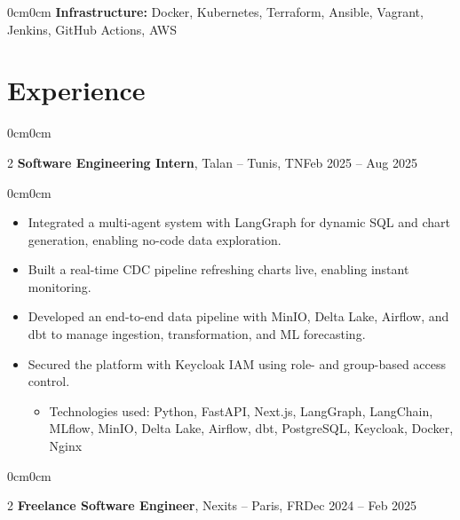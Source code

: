 \documentclass[10pt, a4paper]{article}
\newenvironment{highlights}{\begin{itemize}[topsep=0.10 cm, parsep=0.10 cm, partopsep=0pt, itemsep=0pt, leftmargin=0 cm + 10pt]}{\end{itemize}}
\newenvironment{highlightsforbulletentries}{\begin{itemize}[topsep=0.10 cm, parsep=0.10 cm, partopsep=0pt, itemsep=0pt, leftmargin=10pt]}{\end{itemize}}
\newenvironment{onecolentry}{\begin{adjustwidth}{0cm}{0cm}}{\end{adjustwidth}}
\newenvironment{twocolentry}[2][]{\onecolentry \def\secondColumn{#2} \setcolumnwidth{\fill, 4.5 cm} \begin{paracol}{2}}{\switchcolumn \raggedleft \secondColumn \end{paracol} \end{onecolentry}}
\begin{document}
\begin{onecolentry}
\textbf{Infrastructure:} Docker, Kubernetes, Terraform, Ansible, Vagrant, Jenkins, GitHub Actions, AWS
\end{onecolentry}

\section{Experience}

\begin{twocolentry}{Feb 2025 -- Aug 2025}
\textbf{Software Engineering Intern}, Talan -- Tunis, TN\end{twocolentry}

\vspace{0.10 cm}
\begin{onecolentry}
  \begin{highlights}
  \item Integrated a multi-agent system with LangGraph for dynamic SQL and chart generation, enabling no-code data exploration.
  \item Built a real-time CDC pipeline refreshing charts live, enabling instant monitoring.
  \item Developed an end-to-end data pipeline with MinIO, Delta Lake, Airflow, and dbt to manage ingestion, transformation, and ML forecasting.
  \item Secured the platform with Keycloak IAM using role- and group-based access control.
    \begin{highlightsforbulletentries}
    \item Technologies used: Python, FastAPI, Next.js, LangGraph, LangChain, MLflow, MinIO, Delta Lake, Airflow, dbt, PostgreSQL, Keycloak, Docker, Nginx
    \end{highlightsforbulletentries}
  \end{highlights}
\end{onecolentry}

\vspace{0.2 cm}
\begin{twocolentry}{Dec 2024 -- Feb 2025}
\textbf{Freelance Software Engineer}, Nexits -- Paris, FR\end{twocolentry}
\end{document}
